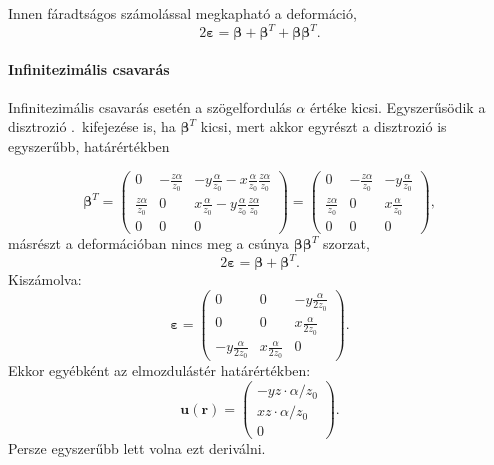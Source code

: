 \documentclass[12pt,a4paper]{scrartcl}
\let\mathbf\bm
\begin{document}
Innen fáradtságos számolással megkapható a deformáció,
\[2{\mathbf{\varepsilon }} = {\mathbf{\beta }} + {{\mathbf{\beta }}^T} + {\mathbf{\beta }}{{\mathbf{\beta }}^T}.\]

\paragraph{Infinitezimális csavarás}
Infinitezimális csavarás esetén a szögelfordulás $\alpha$ értéke kicsi. Egyszerűsödik a disztrozió .\ kifejezése is, ha ${\mathbf{\beta }^T}$ kicsi, mert akkor egyrészt a disztrozió is egyszerűbb, határértékben

\[{{\mathbf{\beta }}^T} = \left( {\begin{array}{*{20}{c}}
  0&{ - \frac{{z\alpha }}{{{z_0}}}}&{ - y\frac{\alpha }{{{z_0}}} - x\frac{\alpha }{{{z_0}}}\frac{{z\alpha }}{{{z_0}}}} \\ 
  {\frac{{z\alpha }}{{{z_0}}}}&0&{x\frac{\alpha }{{{z_0}}} - y\frac{\alpha }{{{z_0}}}\frac{{z\alpha }}{{{z_0}}}} \\ 
  0&0&0 
\end{array}} \right) = \left( {\begin{array}{*{20}{c}}
  0&{ - \frac{{z\alpha }}{{{z_0}}}}&{ - y\frac{\alpha }{{{z_0}}}} \\ 
  {\frac{{z\alpha }}{{{z_0}}}}&0&{x\frac{\alpha }{{{z_0}}}} \\ 
  0&0&0 
\end{array}} \right),\]
másrészt a deformációban nincs meg a csúnya ${\mathbf{\beta }}{{\mathbf{\beta }}^T}$ szorzat, 
\[2{\mathbf{\varepsilon }} = {\mathbf{\beta }} + {{\mathbf{\beta }}^T}.\]
Kiszámolva:
\[{\mathbf{\varepsilon }} = \left( {\begin{array}{*{20}{c}}
  0&0&{ - y\frac{\alpha }{{2{z_0}}}} \\ 
  0&0&{x\frac{\alpha }{{2{z_0}}}} \\ 
  { - y\frac{\alpha }{{2{z_0}}}}&{x\frac{\alpha }{{2{z_0}}}}&0 
\end{array}} \right).\]
Ekkor egyébként az elmozdulástér határértékben:
\[{\mathbf{u}}\left( {\mathbf{r}} \right) = \left( {\begin{array}{*{20}{c}}
  { - yz \cdot \alpha /{z_0}} \\ 
  {xz \cdot \alpha /{z_0}} \\ 
  0 
\end{array}} \right).\]
Persze egyszerűbb lett volna ezt deriválni.
\end{document}
